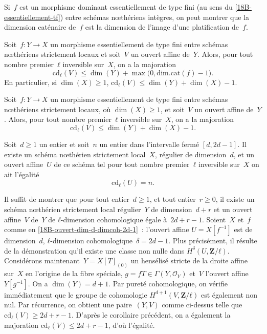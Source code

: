 \documentclass[10pt]{../fichiers-configuration-latex/smfart}
\begin{document}
\begin{remarque2}
Si $f$ est un morphisme dominant essentiellement de type
fini (au sens du \ref{18B-essentiellement-tf}) entre schémas nœthériens intègres, on peut montrer
que la dimension caténaire de $f$
est la dimension de l'image d'une platification
de $f$.
\end{remarque2}

\begin{théorème2}
Soit $f:Y → X$ un morphisme essentiellement de type fini
entre schémas nœthériens strictement locaux et soit $V$ un
ouvert affine de $Y$. Alors, pour tout nombre premier $ℓ$
inversible sur $X$, on a la majoration
\[ \mathrm{cd}_ℓ(V) ≤
\dim(Y)+\max\big(0,\mathrm{dim.cat}(f)-1\big).  \] En
particulier, si $\dim(X) ≥ 1$, $\mathrm{cd}_ℓ(V) ≤
\dim(Y)+\dim(X)-1$.
\end{théorème2}

\begin{corollaire2}
Soit $f:Y → X$ un morphisme essentiellement de type fini
entre schémas nœthériens strictement locaux, où $\dim(X) ≥ 1$,
et soit $V$ un ouvert affine de $Y$. Alors, pour tout nombre premier $ℓ$
inversible sur $X$, on a la majoration
\[ \mathrm{cd}_ℓ(V) ≤
\dim(Y)+\dim(X)-1.\]
\end{corollaire2}

\begin{corollaire2}
\label{18B-n-entre-d-et-2d-1}
Soit $d ≥ 1$ un entier et soit $n$ un entier dans
l'intervalle fermé $[d,2d-1]$. Il existe un schéma
nœthérien strictement local $X$, régulier de dimension $d$,
et un ouvert affine $U$ de ce schéma tel pour tout nombre
premier $ℓ$ inversible sur $X$ on ait l'égalité
\[
\mathrm{cd}_ℓ(U)=n.
\]
\end{corollaire2}

\begin{démo}
Il suffit de montrer que pour tout entier $d ≥ 1$, et tout entier $r ≥ 0$,
il existe un schéma nœthérien strictement local régulier $Y$ de
dimension $d+r$ et un ouvert affine $V$ de $Y$
de $ℓ$-dimension cohomologique égale
à $2d+r -1$. Soient $X$ et $f$ comme en
\ref{18B-ouvert-dim-d-dimcoh-2d-1} :
l'ouvert affine $U=X[f^{-1}]$ est
de dimension $d$, $ℓ$-dimension cohomologique $δ=2d-1$.
Plus précisément, il résulte de la démonstration
qu'il existe une classe non nulle dans $H^δ(U,𝐙/ℓ)$.
Considérons maintenant $Y=X[T]_{(0)}$ un hensélisé stricte
de la droite affine sur $X$ en l'origine de la fibre
spéciale, $g=fT ∈ Γ(Y,𝒪_Y)$ et $V$ l'ouvert affine
$Y[g^{-1}]$. On a $\dim(Y)=d+1$. Par pureté cohomologique,
on vérifie immédiatement que le groupe de cohomologie $H^{d+1}(V,𝐙/ℓ)$
est également non nul. Par récurrence, on obtient une
paire $(Y,V)$ comme ci-dessus telle que $\mathrm{cd}_ℓ(V) ≥ 2d+r-1$.
D'après le corollaire précédent, on a également la majoration
$\mathrm{cd}_ℓ(V) ≤ 2d+r-1$, d'où l'égalité.
\end{démo}
\end{document}
